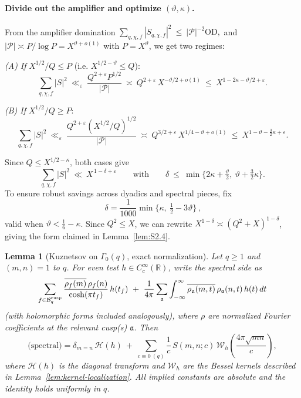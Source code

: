 \documentclass[11pt]{article}
\newtheorem{lemma}{Lemma}[section]
\theoremstyle{definition}
\theoremstyle{remark}
\begin{document}
\paragraph{Divide out the amplifier and optimize $(\vartheta,\kappa)$.}
From the amplifier domination
\(
\sum_{q,\chi,f}|S_{q,\chi,f}|^2\ \le\ |\mathcal P|^{-2}\mathrm{OD},
\)
and $|\mathcal P|\asymp P/\log P=X^{\vartheta+o(1)}$ with $P=X^\vartheta$, we get two regimes:

\smallskip
\noindent\emph{(A) If } $X^{1/2}/Q\le P$ (i.e. $X^{1/2-\vartheta}\le Q$):
\[
	\sum_{q,\chi,f}|S|^2\ \ll_\varepsilon\ \frac{Q^{2+\varepsilon}P^{1/2}}{|\mathcal P|}\ \asymp\ Q^{2+\varepsilon}\,X^{-\vartheta/2+o(1)}
	\ \le\ X^{1-2\kappa-\vartheta/2+\varepsilon}.
\]

\noindent\emph{(B) If } $X^{1/2}/Q\ge P$:
\[
	\sum_{q,\chi,f}|S|^2\ \ll_\varepsilon\ \frac{Q^{2+\varepsilon}(X^{1/2}/Q)^{1/2}}{|\mathcal P|}
	\ \asymp\ Q^{3/2+\varepsilon}\,X^{1/4-\vartheta+o(1)}
	\ \le\ X^{1-\vartheta-\tfrac{3}{2}\kappa+\varepsilon}.
\]

Since $Q\le X^{1/2-\kappa}$, both cases give
\[
	\sum_{q,\chi,f}|S|^2\ \ll\ X^{\,1-\delta+\varepsilon}
	\qquad\text{with}\qquad
	\delta\ \le\ \min\Big\{2\kappa+\tfrac{\vartheta}{2},\ \vartheta+\tfrac{3}{2}\kappa\Big\}.
\]
To ensure robust savings across dyadics and spectral pieces, fix
\[
	\boxed{\ \delta=\frac{1}{1000}\min\!\Big\{\kappa,\ \tfrac12-3\vartheta\Big\}\ },
\]
valid when $\vartheta<\tfrac16-\kappa$. Since $Q^2\le X$, we can rewrite $X^{1-\delta}\asymp(Q^2+X)^{1-\delta}$, giving the form claimed in Lemma~\ref{lem:S2.4}.

\begin{lemma}[Kuznetsov on $\Gamma_0(q)$, exact normalization]\label{lem:kuz}
	Let $q\ge 1$ and $(m,n)=1$ to $q$. For even test $h\in C_c^\infty(\mathbb R)$, write the spectral side as
	\[
		\sum_{f\in \mathcal B_q^{\rm cusp}} \frac{\overline{\rho_f(m)}\,\rho_f(n)}{\cosh(\pi t_f)}\,h(t_f)
		\ +\ \frac{1}{4\pi}\sum_{\mathfrak a}\int_{-\infty}^{\infty} \overline{\rho_{\mathfrak a}(m,t)}\,\rho_{\mathfrak a}(n,t)\,h(t)\,dt
	\]
	(with holomorphic forms included analogously), where $\rho$ are normalized Fourier coefficients at the relevant cusp(s) $\mathfrak a$. Then
	\[
		\text{(spectral)}
		=\delta_{m=n}\,\mathcal H(h)\ +\ \sum_{c\equiv 0\ (q)} \frac{1}{c}\,S(m,n;c)\,\mathcal W_h\!\left(\frac{4\pi\sqrt{mn}}{c}\right),
	\]
	where $\mathcal H(h)$ is the diagonal transform and $\mathcal W_h$ are the Bessel kernels described in Lemma~\ref{lem:kernel-localization}. All implied constants are absolute and the identity holds uniformly in $q$.
\end{lemma}
\end{document}
